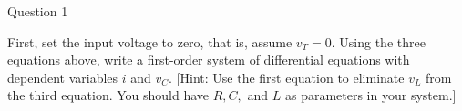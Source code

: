 \documentclass[preview]{standalone}
\begin{document}
\begin{center}
Question 1
                    
                         First, set the input voltage to zero, that is, assume $v_T = 0$. Using the three equations
                        above, write a first-order system of differential equations with dependent variables $i$
                        and $v_C$. [Hint: Use the first equation to eliminate $v_L$ from the third equation. You
                        should have $R, C,$ and $L$ as parameters in your system.]
\end{center}
\end{document}
